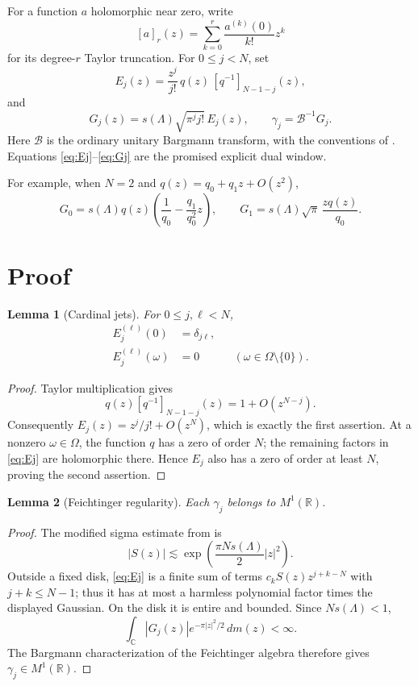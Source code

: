 \documentclass[11pt]{article}
\newtheorem{lemma}{Lemma}
\newcommand{\C}{\mathbb C}
\newcommand{\R}{\mathbb R}
\newcommand{\Barg}{\mathcal B}
\begin{document}
For a function $a$ holomorphic near zero, write
\[
 [a]_r(z)=\sum_{k=0}^{r}\frac{a^{(k)}(0)}{k!}z^k
\]
for its degree-$r$ Taylor truncation.  For $0\le j<N$, set
\begin{equation}\label{eq:Ej}
 E_j(z)=\frac{z^j}{j!}\,q(z)\,[q^{-1}]_{N-1-j}(z),
\end{equation}
and
\begin{equation}\label{eq:Gj}
 G_j(z)=s(\Lambda)\sqrt{\pi^j j!}\,E_j(z),
 \qquad
 \gamma_j=\Barg^{-1}G_j.
\end{equation}
Here $\Barg$ is the ordinary unitary Bargmann transform, with the conventions
of \cite{GL}.  Equations \eqref{eq:Ej}--\eqref{eq:Gj} are the promised
explicit dual window.

For example, when $N=2$ and
$q(z)=q_0+q_1z+O(z^2)$,
\[
 G_0=s(\Lambda)q(z)\left(\frac1{q_0}-\frac{q_1}{q_0^2}z\right),
 \qquad
 G_1=s(\Lambda)\sqrt\pi\,\frac{zq(z)}{q_0}.
\]

\section{Proof}

\begin{lemma}[Cardinal jets]\label{lem:jets}
For $0\le j,\ell<N$,
\begin{align*}
 E_j^{(\ell)}(0)&=\delta_{j\ell},\\
 E_j^{(\ell)}(\omega)&=0
   &&(\omega\in\Omega\setminus\{0\}).
\end{align*}
\end{lemma}

\begin{proof}
Taylor multiplication gives
\[
 q(z)[q^{-1}]_{N-1-j}(z)=1+O(z^{N-j}).
\]
Consequently
$E_j(z)=z^j/j!+O(z^N)$, which is exactly the first assertion.
At a nonzero $\omega\in\Omega$, the function $q$ has a zero of order $N$;
the remaining factors in \eqref{eq:Ej} are holomorphic there.  Hence $E_j$
also has a zero of order at least $N$, proving the second assertion.
\end{proof}

\begin{lemma}[Feichtinger regularity]\label{lem:m1}
Each $\gamma_j$ belongs to $M^1(\R)$.
\end{lemma}

\begin{proof}
The modified sigma estimate from \cite{GL} is
\[
 |S(z)|\lesssim
 \exp\!\left(\frac{\pi Ns(\Lambda)}2|z|^2\right).
\]
Outside a fixed disk, \eqref{eq:Ej} is a finite sum of terms
$c_kS(z)z^{j+k-N}$ with $j+k\le N-1$; thus it has at most a harmless
polynomial factor times the displayed Gaussian.  On the disk it is entire
and bounded.  Since $Ns(\Lambda)<1$,
\[
 \int_{\C}|G_j(z)|e^{-\pi|z|^2/2}\,dm(z)<\infty.
\]
The Bargmann characterization of the Feichtinger algebra therefore gives
$\gamma_j\in M^1(\R)$.
\end{proof}
\end{document}
